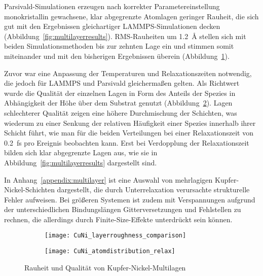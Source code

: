 Parsivald-Simulationen erzeugen nach korrekter Parametereinstellung monokristallin gewachsene, klar abgegrenzte Atomlagen geringer Rauheit, die sich gut mit den Ergebnissen gleichartiger LAMMPS-Simulationen decken (Abbildung~\ref{fig:multilayerresults}).
RMS-Rauheiten um \SI{1.2}{\angstrom} stellen sich mit beiden Simulationsmethoden bis zur zehnten Lage ein und stimmen somit miteinander und mit den bisherigen Ergebnissen überein (Abbildung~\ref{fig:multilayerplots-a}).

Zuvor war eine Anpassung der Temperaturen und Relaxationszeiten notwendig, die jedoch für LAMMPS und Parsivald gleichermaßen gelten.
Als Richtwert wurde die Qualität der einzelnen Lagen in Form des Anteils der Spezies in Abhängigkeit der Höhe über dem Substrat genutzt (Abbildung~\ref{fig:multilayerplots-b}).
Lagen schlechterer Qualität zeigen eine höhere Durchmischung der Schichten, was wiederum zu einer Senkung der relativen Häufigkeit einer Spezies innerhalb ihrer Schicht führt, wie man für die beiden Verteilungen bei einer Relaxationszeit von \SI{0.2}{\femto\second} pro Ereignis beobachten kann.
Erst bei Verdopplung der Relaxationszeit bilden sich klar abgegrenzte Lagen aus, wie sie in Abbildung~\ref{fig:multilayerresults} dargestellt sind.

In Anhang~\ref{appendix:multilayer} ist eine Auswahl von mehrlagigen Kupfer-Nickel-Schichten dargestellt, die durch Unterrelaxation verursachte strukturelle Fehler aufweisen.
Bei größeren Systemen ist zudem mit Verspannungen aufgrund der unterschiedlichen Bindungslängen Gitterversetzungen und Fehlstellen zu rechnen, die allerdings durch Finite-Size-Effekte unterdrückt sein können.

\begin{figure}
  \captionsetup[subfigure]{singlelinecheck=false}
  \def\subfigwidth{7cm}
  \begin{subfigure}[t]{\subfigwidth}
    \texttt{[image: CuNi\_layerroughness\_comparison]}
    \label{fig:multilayerplots-a}
  \end{subfigure}
  \hfill
  \begin{subfigure}[t]{\subfigwidth}
    \texttt{[image: CuNi\_atomdistribution\_relax]}
    \label{fig:multilayerplots-b}
  \end{subfigure}
  \caption[Rauheit und Qualität von Kupfer-Nickel-Multilagen]{
    Rauheit und Qualität von Kupfer-Nickel-Multilagen
  }
  \label{fig:multilayerplots}
\end{figure}

